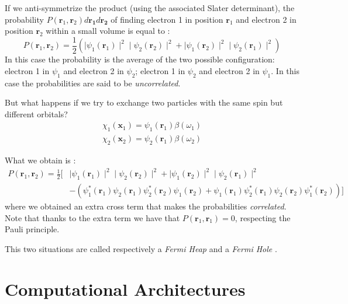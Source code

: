 \documentclass[a4paper,12pt]{article}
\begin{document}
If we anti-symmetrize the product (using the associated Slater determinant), the probability $P(\mathbf{r}_{1},\mathbf{r}_{2}) d\mathbf{r_{1}} d\mathbf{r_{2}}$ of finding electron 1 in position $\mathbf{r}_{1}$ and electron 2 in position $\mathbf{r}_{2}$ within a small volume is equal to \cite[p.52]{Attila}:
\begin{equation*}
	P(\mathbf{r}_{1},\mathbf{r}_{2}) = 
		\frac{1}{2} ( 
			\mid \psi_{1}(\mathbf{r}_1) \mid ^2    
			\mid \psi_{2}(\mathbf{r}_2) \mid ^2   
				+
			\mid \psi_{1}(\mathbf{r}_2) \mid ^2    
			\mid \psi_{2}(\mathbf{r}_1) \mid ^2   
			)
\end{equation*}
In this case the probability is the average of the two possible configuration: electron 1 in $\psi_1$ and electron 2 in $\psi_2$; electron 1 in $\psi_2$ and electron 2 in $\psi_1$.
In this case the probabilities are said to be \textit{uncorrelated}.

But what happens if we try to exchange two particles with the same spin but different orbitals?
\begin{align*}
	\chi_{1}(\mathbf{x}_{1}) = \psi_{1}(\mathbf{r}_{1}) \beta(\omega_{1})\\
	\chi_{2}(\mathbf{x}_{2}) = \psi_{2}(\mathbf{r}_{1}) \beta(\omega_{2})
\end{align*}

What we obtain is \cite[p.53]{Attila}:
\begin{align*}
	P(\mathbf{r}_{1},\mathbf{r}_{2}) = 
		\frac{1}{2} [ &
			\mid \psi_{1}(\mathbf{r}_1) \mid ^2    
			\mid \psi_{2}(\mathbf{r}_2) \mid ^2   
				+
			\mid \psi_{1}(\mathbf{r}_2) \mid ^2    
			\mid \psi_{2}(\mathbf{r}_1) \mid ^2   
\\
			& - ( \psi_{1}^*(\mathbf{r}_1) \psi_{2}(\mathbf{r}_1) \psi_{2}^*(\mathbf{r}_2) \psi_{1}(\mathbf{r}_2)
			 + \psi_{1}(\mathbf{r}_1) \psi_{2}^*(\mathbf{r}_1) \psi_{2}(\mathbf{r}_2) \psi_{1}^*(\mathbf{r}_2))]
\end{align*}
where we obtained an extra cross term that makes the probabilities \textit{correlated}. Note that thanks to the extra term we have that $P(\mathbf{r}_{1},\mathbf{r}_{1}) = 0$, respecting the Pauli principle.

This two situations are called respectively a \textit{Fermi Heap} and a \textit{Fermi Hole} \cite{Dan}.




\section{Computational Architectures} \label{comparch:sec}
\end{document}
